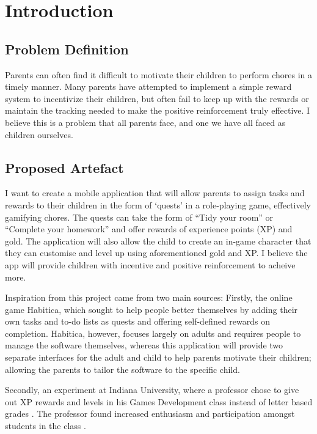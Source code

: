 \chapter{Introduction}
\label{chap:intro}

\section{Problem Definition}
Parents can often find it difficult to motivate their children to perform chores in a timely manner. 
Many parents have attempted to implement a simple reward system to incentivize their children, but often fail to keep up with the rewards or maintain the tracking needed to make the positive reinforcement truly effective.
I believe this is a problem that all parents face, and one we have all faced as children ourselves.  

\section{Proposed Artefact}
I want to create a mobile application that will allow parents to assign tasks and rewards to their children in the form of `quests' in a role-playing game, effectively gamifying chores. 
The quests can take the form of ``Tidy your room'' or ``Complete your homework'' and offer rewards of experience points (XP) and gold. The application will also allow the child to create an in-game character that they can customise and level up using aforementioned gold and XP.
I believe the app will provide children with incentive and positive reinforcement to acheive more.

Inspiration from this project came from two main sources: Firstly, the online game Habitica, which sought to help people better themselves by adding their own tasks and to-do lists as quests and offering self-defined rewards on completion. 
Habitica, however, focuses largely on adults and requires people to manage the software themselves, whereas this application will provide two separate interfaces for the adult and child to help parents motivate their children; allowing the parents to tailor the software to the specific child.

Secondly, an experiment at Indiana University, where a professor chose to give out XP rewards and levels in his Games Development class instead of letter based grades \cite{sheldon2011multiplayer}.  
The professor found increased enthusiasm and participation amongst students in the class \cite{sheldonclasspostmortem}.

